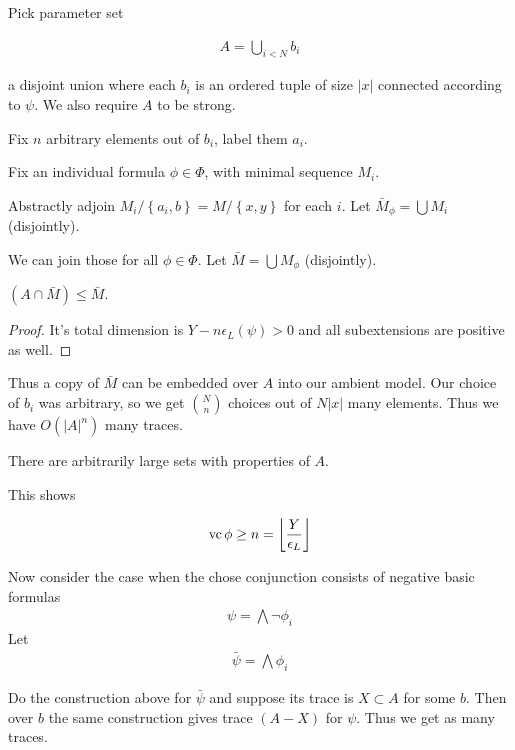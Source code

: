 \documentclass{amsart}
\newcommand{\curly}[1]{\left\{#1\right\}}
\providecommand{\floor}[1]{\left \lfloor #1 \right \rfloor }
\begin{document}
Pick parameter set 

\begin{align*}
	A = \bigcup_{i<N} b_i
\end{align*}

a disjoint union where each $b_i$ is an ordered tuple of size $|x|$ connected according to $\psi$.
We also require $A$ to be strong.

Fix $n$ arbitrary elements out of $b_i$, label them $a_i$.

Fix an individual formula $\phi \in \Phi$, with minimal sequence $M_i$.

Abstractly adjoin $M_i/\curly{a_i, b} = M/\curly{x,y}$ for each $i$.
Let $\bar M_\phi = \bigcup M_i$ (disjointly).

We can join those for all $\phi \in \Phi$.
Let $\bar M = \bigcup M_\phi$ (disjointly).

\begin{Claim}
	$(A \cap \bar M) \leq \bar M$.
\end{Claim}
\begin{proof}
	It's total dimension is $Y - n\epsilon_L(\psi) > 0$ and all subextensions are positive as well.
\end{proof}

Thus a copy of $\bar M$ can be embedded over $A$ into our ambient model.
Our choice of $b_i$ was arbitrary, so we get ${N \choose n}$ choices out of $N|x|$ many elements.
Thus we have $O(|A|^n)$ many traces.

\begin{Lemma}
	There are arbitrarily large sets with properties of $A$.
\end{Lemma}

This shows

\begin{align*}
	\vc \phi \geq n = \floor{\frac{Y}{\epsilon_L}}
\end{align*}

Now consider the case when the chose conjunction consists of negative basic formulas
\begin{align*}
	\psi = \bigwedge \neg \phi_i
\end{align*}
Let
\begin{align*}
	\bar \psi = \bigwedge \phi_i
\end{align*}

Do the construction above for $\bar \psi$ and suppose its trace is $X \subset A$ for some $b$.
Then over $b$ the same construction gives trace $(A - X)$ for $\psi$. Thus we get as many traces.
\end{document}
